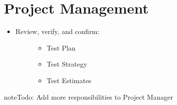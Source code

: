\documentclass[letterpaper,10pt,english]{sphinxmanual}
\begin{document}
\section{Project Management}
\label{\detokenize{test_plan/roles_and_responsibilities:project-management}}
\begin{itemize}
\item {} \begin{description}
\item[{Review, verify, and confirm:}] \leavevmode\begin{itemize}
\item {} 
Test Plan

\item {} 
Test Strategy

\item {} 
Test Estimates

\end{itemize}

\end{description}

\end{itemize}

\begin{sphinxadmonition}{note}{\label{test_plan/roles_and_responsibilities:index-0}Todo:}
Add more responsibilities to Project Manager
\end{sphinxadmonition}
\end{document}
